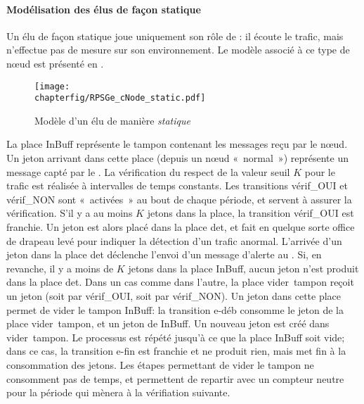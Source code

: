             \paragraph{Modélisation des \cns élus de façon statique}
Un \cn élu de façon statique joue uniquement son rôle de \cn: il écoute le trafic, mais n'effectue pas de mesure sur son environnement.
Le modèle \rpsge associé à ce type de nœud est présenté en .
\begin{figure}[ht]
    \centering
    \texttt{[image: \\chapterfig/RPSGe\_cNode\_static.pdf]}
    \caption{Modèle \rpsge d'un \cn élu de manière \emph{statique}}\label{sa:fig:cnodegspn1}
\end{figure}
La place \textsf{InBuff} représente le tampon contenant les messages reçu par le nœud.
Un jeton arrivant dans cette place (depuis un nœud «~normal~») représente un message capté par le \cn.
La vérification du respect de la valeur seuil $K$ pour le trafic est réalisée à intervalles de temps constants.
Les transitions \textsf{vérif\_OUI} et \textsf{vérif\_NON} sont «~activées~» au bout de chaque période, et servent à assurer la vérification.
S'il y a au moins $K$ jetons dans la place, la transition \textsf{vérif\_OUI} est franchie.
Un jeton est alors placé dans la place \textsf{det}, et fait en quelque sorte office de drapeau levé pour indiquer la détection d'un trafic anormal.
L'arrivée d'un jeton dans la place \textsf{det} déclenche l'envoi d'un message d'alerte au \ch.
Si, en revanche, il y a moins de $K$ jetons dans la place \textsf{InBuff}, aucun jeton n'est produit dans la place \textsf{det}.
Dans un cas comme dans l'autre, la place \textsf{vider~tampon} reçoit un jeton (soit par \textsf{vérif\_OUI}, soit par \textsf{vérif\_NON}).
Un jeton dans cette place permet de vider le tampon \textsf{InBuff}: la transition \textsf{e-déb} consomme le jeton de la place \textsf{vider~tampon}, et un jeton de \textsf{InBuff}.
Un nouveau jeton est créé dans \textsf{vider~tampon}.
Le processus est répété jusqu'à ce que la place \textsf{InBuff} soit vide; dans ce cas, la transition \textsf{e-fin} est franchie et ne produit rien, mais met fin à la consommation des jetons.
Les étapes permettant de vider le tampon ne consomment pas de temps, et permettent de repartir avec un compteur neutre pour la période qui mènera à la vérifiation suivante.

